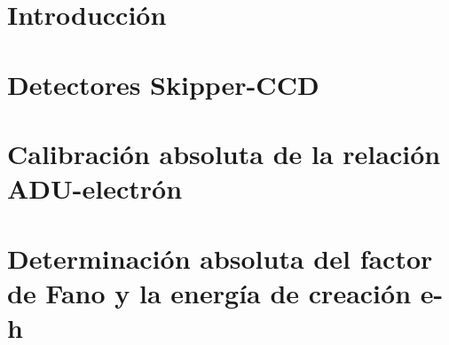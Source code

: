 \documentclass[a4paper,12pt]{report} %
\begin{document}
\newpage
{}  %
\setcounter{page}{1}    %
\singlespace
\chapter{Introducción}


\singlespace
\chapter{Detectores Skipper-CCD}
\label{cap:detectores}


\singlespace
\chapter{Calibración absoluta de la relación ADU-electrón} \label{cap: calibracion}

\singlespace
\chapter{Determinación absoluta del factor de Fano y la energía de creación e-h}
\label{cap:fano}

\singlespace
\end{document}
